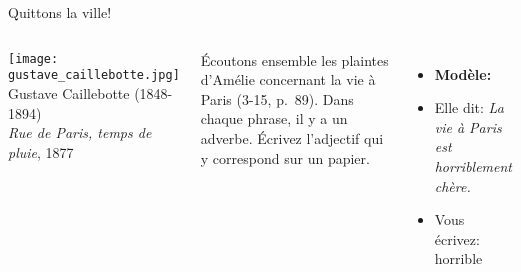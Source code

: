 \begin{frame}{Quittons la ville!}
  \begin{columns}
      \begin{center}
        \small
        \texttt{[image: gustave\_caillebotte.jpg]} \\
        Gustave Caillebotte (1848-1894) \\
        \emph{Rue de Paris, temps de pluie}, 1877
      \end{center}
      Écoutons ensemble les plaintes d'Amélie concernant la vie à Paris (3-15, p.~89).
      Dans chaque phrase, il y a un adverbe.
      Écrivez l'adjectif qui y correspond sur un papier.
      \begin{itemize}
        \item \textbf{Modèle:}
        \item Elle dit: \emph{La vie à Paris est horriblement chère.}
        \item Vous écrivez: horrible
      \end{itemize}
  \end{columns}
\end{frame}